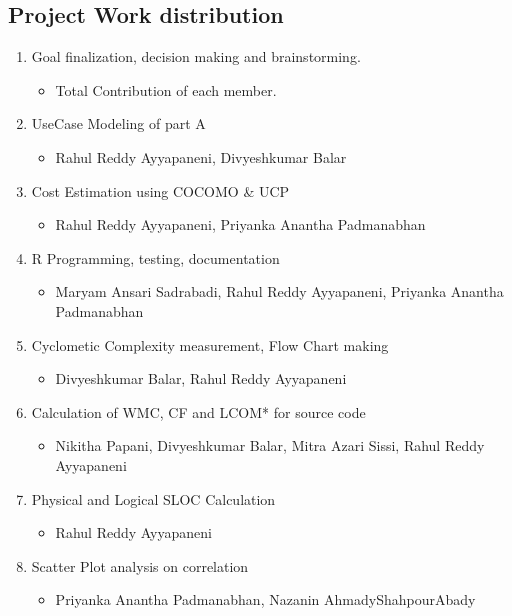 \documentclass[a4paper, 11pt]{article}
\begin{document}
\subsection{Project Work distribution}
\begin{enumerate}
  
  \item Goal finalization, decision making and brainstorming.
   \begin{itemize}
     \item Total Contribution of each member.
   \end{itemize}
      
   \item UseCase Modeling of part A
   \begin{itemize}
     \item Rahul Reddy Ayyapaneni, Divyeshkumar Balar
   \end{itemize}
   
   \item Cost Estimation using COCOMO \& UCP
   \begin{itemize}
     \item Rahul Reddy Ayyapaneni, Priyanka Anantha Padmanabhan
   \end{itemize}
   
   \item R Programming, testing, documentation
   \begin{itemize}
     \item Maryam Ansari Sadrabadi, Rahul Reddy Ayyapaneni, Priyanka Anantha Padmanabhan
   \end{itemize}
   
      \item Cyclometic Complexity measurement, Flow Chart making
   \begin{itemize}
     \item Divyeshkumar Balar, Rahul Reddy Ayyapaneni
   \end{itemize}
   
      \item Calculation of WMC, CF and LCOM* for source code
   \begin{itemize}
     \item Nikitha Papani, Divyeshkumar Balar, Mitra Azari Sissi, Rahul Reddy Ayyapaneni
   \end{itemize}
   
      \item Physical and Logical SLOC Calculation
   \begin{itemize}
     \item Rahul Reddy Ayyapaneni
   \end{itemize}
   
   \item Scatter Plot analysis on correlation
   \begin{itemize}
     \item Priyanka Anantha Padmanabhan, Nazanin AhmadyShahpourAbady
   \end{itemize}
\end{enumerate}
\end{document}
